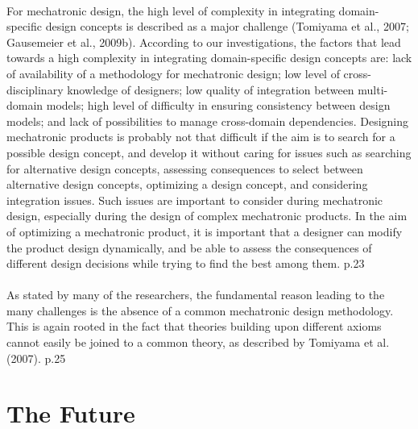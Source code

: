 \documentclass[a4paper,12pt,twoside]{report}
\begin{document}
{			\paragraph{}{For mechatronic design, the high level of complexity in integrating domain-specific design concepts is described as a major challenge (Tomiyama et al., 2007; Gausemeier et al., 2009b). According to our investigations, the factors that lead towards a high complexity in integrating domain-specific design concepts are: lack of availability of a methodology for mechatronic design; low level of cross-disciplinary knowledge of designers; low quality of integration between multi-domain models; high level of difficulty in ensuring consistency between design models; and lack of possibilities to manage cross-domain dependencies. Designing mechatronic products is probably not that difficult if the aim is to search for a possible design concept, and develop it without caring for issues such as searching for alternative design concepts, assessing consequences to select between alternative design concepts, optimizing a design concept, and considering integration issues. Such issues are important to consider during mechatronic design, especially during the design of complex mechatronic products. In the aim of optimizing a mechatronic product, it is important that a designer can modify the product design dynamically, and be able to assess the consequences of different design decisions while trying to find the best among them.\cite{IntegratedApproachMBMechatronicDesign:Qamar2011} p.23
			}
			\paragraph{}{As stated by many of the researchers, the fundamental reason leading to the many challenges is the absence of a common mechatronic design methodology. This is again rooted in the fact that theories building upon different axioms cannot easily be joined to a common theory, as described by Tomiyama et al. (2007).\cite{IntegratedApproachMBMechatronicDesign:Qamar2011} p.25
			}

			\section{The Future}
}
\end{document}
